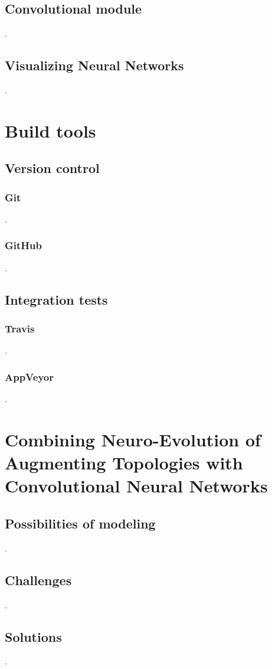 \documentclass[11pt]{article}
\begin{document}
		\subsection{Convolutional module}
			.
		\subsection{Visualizing Neural Networks}
			.
	\newpage

	\section{Build tools}
		\subsection{Version control}
			\subsubsection{Git}
				.
			\subsubsection{GitHub}
				.
		\subsection{Integration tests}
			\subsubsection{Travis}
				.
			\subsubsection{AppVeyor}
				.
	\newpage

	\section{Combining Neuro-Evolution of Augmenting Topologies with Convolutional Neural Networks}
		\subsection{Possibilities of modeling}
			.
		\subsection{Challenges}
			.
		\subsection{Solutions}
			.
\end{document}
